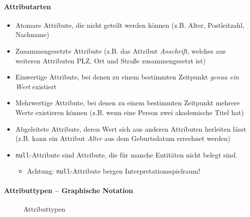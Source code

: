 \begin{frame}[t]{\insertsection}
\framesubtitle{Attributarten}
\onslide
\begin{itemize}
	\item Atomare Attribute, die nicht geteilt werden können (z.B. Alter, Postleitzahl, Nachname)
	\item Zusammengesetzte Attribute (z.B. das Attribut \textit{Anschrift}, welches aus weiteren Attributen
	PLZ, Ort und Straße zusammengesetzt ist)
	\pause
	\item Einwertige Attribute, bei denen zu einem bestimmten Zeitpunkt \textit{genau ein Wert} existiert 
	\item Mehrwertige Attribute, bei denen zu einem bestimmten Zeitpunkt mehrere Werte existieren können (z.B. wenn eine Person zwei akademische Titel hat)
	\pause
	\item Abgeleitete Attribute, deren Wert sich aus anderen Attributen herleiten lässt (z.B. kann ein Attribut \textit{Alter} aus dem Geburtsdatum errechnet werden)
\end{itemize}
\pause
\abs
{}
\begin{itemize}
	\item \texttt{null}-Attribute sind Attribute, die f\"ur manche Entitäten nicht belegt sind. 
	\begin{itemize}
		\item \alert{Achtung: \texttt{null}-Attribute bergen Interpretationsspielraum!} 
	\end{itemize}
\end{itemize}
\end{frame}

\begin{frame}{\insertsection}
\framesubtitle{Attributtypen -- Graphische Notation}
\begin{figure}
\caption{Attributtypen}
\end{figure}		
\end{frame}

